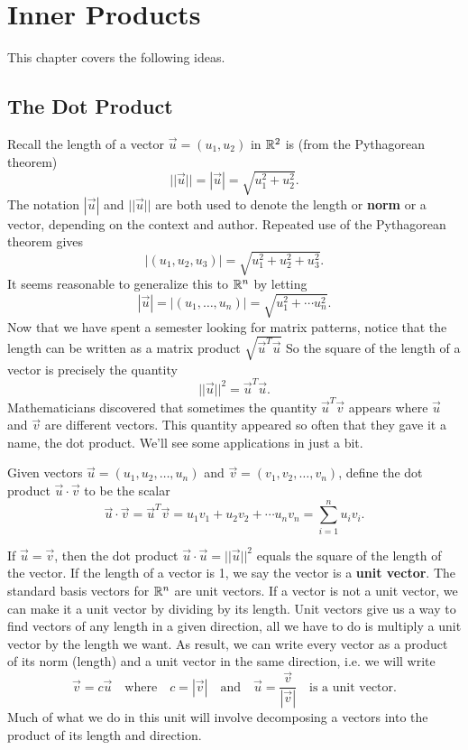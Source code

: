 \chapter{Inner Products}

This chapter covers the following ideas.



\section{The Dot Product}

Recall the length of a vector $\vec u = (u_1,u_2)$ in $\mathbb{R}^2$ is (from the Pythagorean theorem) 
$$||\vec u|| = |\vec u| = \sqrt{u_1^2+u_2^2}.$$ 
The notation $|\vec u|$ and $||\vec u||$ are both used to denote the length or \textbf{norm} or a vector, 
depending on the context and author.  
Repeated use of the Pythagorean theorem gives $$|(u_1,u_2,u_3)|=\sqrt{u_1^2+u_2^2+u_3^2}.$$ 
It seems reasonable to generalize this to $\mathbb{R}^n$ by letting $$|\vec u|=|(u_1,\ldots,u_n)| = \sqrt{u_1^2+\cdots u_n^2}.$$ 
Now that we have spent a semester looking for matrix patterns, notice that the length can be written as a matrix product  $\sqrt{\vec u^T \vec u}$
So the square of the length of a vector is precisely the quantity $$||\vec u||^2 = \vec u^T\vec u.$$  
Mathematicians discovered that sometimes the quantity $\vec u^T\vec v$ appears where $\vec u$ and $\vec v$ are different vectors.  This quantity appeared so often that they gave it a name, the dot product. We'll see some applications in just a bit.

\begin{definition}
Given vectors $\vec u = (u_1,u_2,\ldots, u_n)$ and $\vec v = (v_1,v_2,\ldots, v_n)$, define the dot product $\vec u \cdot \vec v$ to be the scalar 
$$\vec u \cdot\vec v = \vec u^T\vec v = u_1v_1+u_2v_2+\cdots u_nv_n = \sum_{i=1}^n u_iv_i. $$
\end{definition}
If $\vec u = \vec v$, then the dot product $\vec u\cdot \vec u= ||\vec u||^2$ equals the square of the length of the vector. 
If the length of a vector is 1, we say the vector is a \textbf{unit vector}. 
The standard basis vectors for $\mathbb{R}^n$ are unit vectors. 
If a vector is not a unit vector, we can make it a unit vector by dividing by its length. 
Unit vectors give us a way to find vectors of any length in a given direction, all we have to do is multiply a unit vector by the length we want. 
As result, we can write every vector as a product of its norm (length) and a unit vector in the same direction, i.e. we will write $$\vec v= c\vec u\quad \text{where}\quad c=|\vec v|\quad \text{and}\quad\vec u =\frac{\vec v}{|\vec v|} \quad \text{is a unit vector}.$$ 
Much of what we do in this unit will involve decomposing a vectors into the product of its length and direction.



